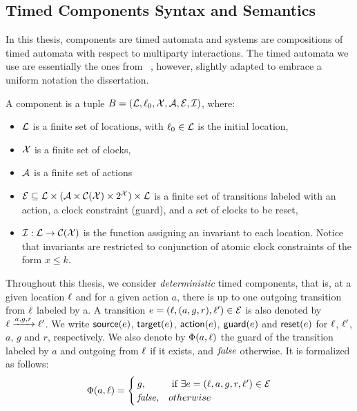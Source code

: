 \subsection{Timed Components Syntax and Semantics}
In this thesis, components are timed automata and systems are compositions of timed automata
with respect to multiparty interactions. The timed automata we use are essentially the ones from
~\cite{AlurD94}, however, slightly adapted to embrace a uniform notation the dissertation.
\begin{definition}\label{def:tc}
  A component is a tuple $B=(\mathcal{L},\ell_0,\mathcal{X},\mathcal{A},\mathcal{E},\mathcal{I})$, where:
  \begin{itemize}
    \item $\mathcal{L}$ is a finite set of locations, with $\ell_0\in\mathcal{L}$ is the 
      initial location,
    \item $\mathcal{X}$ is a finite set of clocks,
    \item $\mathcal{A}$ is a finite set of actions
    \item $\mathcal{E}\subseteq\mathcal{L}\times(\mathcal{A}\times\mathcal{C(X)}\times2^{\mathcal{X}})
      \times\mathcal{L}$ is a finite set of transitions labeled with an action, 
      a clock constraint (guard), and a set of clocks to be reset,
    \item $\mathcal{I}:\mathcal{L}\to\mathcal{C(X)}$ is the function assigning an invariant
      to each location. Notice that invariants are restricted to conjunction
      of atomic clock constraints of the form $x\le k$. 
  \end{itemize}
\end{definition}

Throughout this thesis, we consider 
\emph{deterministic} timed components, that is, at a given location
$\ell$ and for a given action $a$, there is up to one outgoing transition
from $\ell$ labeled by a. 
A transition $e=(\ell,(a,g,r),\ell')\in\mathcal{E}$ is also denoted by
$\ell\xrightarrow{a,g,r}\ell'$. We write $\textsf{source}(e)$, $\textsf{target}(e)$, $\textsf{action}(e)$, $\textsf{guard}(e)$
and $\textsf{reset}(e)$ for $\ell$, $\ell'$, $a$, $g$ and $r$, respectively.
We also denote by $\Phi(a,\ell)$ the guard 
of the transition labeled by $a$ and outgoing from $\ell$
if it exists, and $\textnormal{\textit{false}}$ otherwise. It is formalized as follows:
\[\Phi(a,\ell)=\begin{cases}
  g,& \text{ if } \exists e=(\ell,a,g,r,\ell')\in\mathcal{E}  \\
  \textnormal{\textit{false}},& otherwise
\end{cases}\]

